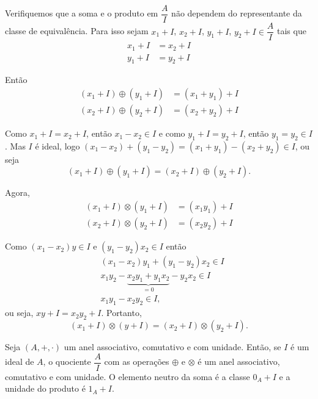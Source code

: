 \documentclass{beamer}
\begin{document}
    \begin{frame}
        Verifiquemos que a soma e o produto em $\dfrac{A}{I}$ n{\~a}o dependem do representante da classe de equival{\^e}ncia.
        Para isso sejam $x_1 + I$, $x_2 + I$, $y_1 + I$, $y_2 + I \in \dfrac{A}{I}$ tais que
        \begin{align*}
            x_1 + I &= x_2 + I\\
            y_1 + I &= y_2 + I  
        \end{align*}

        Ent{\~a}o
        \begin{align*}
            (x_1 + I) \oplus (y_1 + I) &= (x_1 + y_1) + I\\
            (x_2 + I) \oplus (y_2 + I) &= (x_2 + y_2) + I
        \end{align*}
    \end{frame}

    \begin{frame}
        Como $x_1 + I = x_2 + I$, ent{\~a}o $x_1 - x_2 \in I$ e como $y_1 + I = y_2 + I$, ent{\~a}o $y_1 = y_2 \in I$. Mas $I$ {\'e} ideal, logo $(x_1 - x_2) + (y_1 - y_2) = (x_1 + y_1) - (x_2 + y_2) \in I$, ou seja
        \[
            (x_1 + I) \oplus (y_1 + I) = (x_2 + I) \oplus (y_2 + I).
        \]
    \end{frame}

    \begin{frame}
        Agora,
        \begin{align*}
            (x_1 + I) \otimes (y_1 + I) &= (x_1y_1) + I\\
            (x_2 + I) \otimes (y_2 + I) &= (x_2y_2) + I
        \end{align*}

        Como $(x_1 - x_2)y \in I$ e $(y_1 - y_2)x_2 \in I$ ent\~ao
        \begin{align*}
            &(x_1 - x_2)y_1 + (y_1 - y_2)x_2 \in I\\
            &x_1y_2-\underbrace{x_2y_1 + y_1x_2}_{= 0} - y_2x_2 \in I\\
            &x_1y_1 - x_2y_2\in I,
        \end{align*}
        ou seja, $xy + I = x_2y_2 + I$. Portanto,
        \[
            (x_1 + I) \otimes (y + I) = (x_2 + I) \otimes (y_2 + I).
        \]
    \end{frame}

    \begin{frame}
        \begin{teorema}
            Seja $(A, +, \cdot)$ um anel associativo, comutativo e com unidade. Ent{\~a}o, se $I$ {\'e} um ideal de $A$,
            o quociente $\dfrac{A}{I}$ com as opera{\c c}{\~o}es $\oplus$ e $\otimes$ {\'e} um anel associativo,
            comutativo e com unidade. O elemento neutro da soma {\'e} a classe $0_{A} + I$ e a unidade do produto {\'e} $1_{A} + I$.
        \end{teorema}
    \end{frame}
\end{document}
